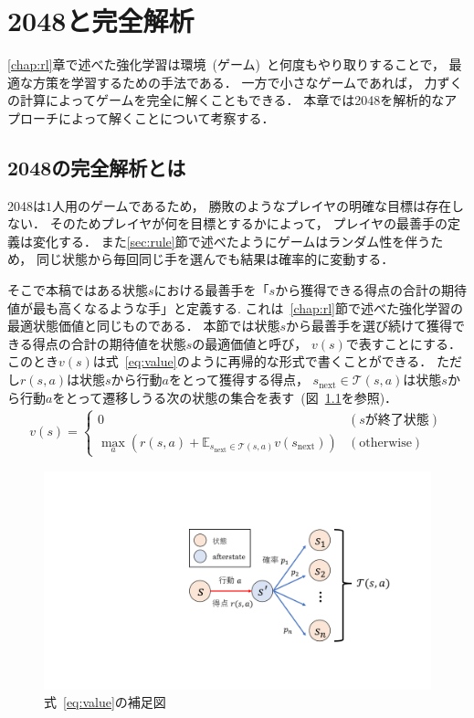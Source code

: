 \chapter{2048と完全解析}
\label{chap:solving}
\ref{chap:rl}章で述べた強化学習は環境~(ゲーム)~と何度もやり取りすることで， 最適な方策を学習するための手法である．
一方で小さなゲームであれば， 力ずくの計算によってゲームを完全に解くこともできる．
本章では2048を解析的なアプローチによって解くことについて考察する．

\section{2048の完全解析とは}
\label{sec:solving}
2048は$1$人用のゲームであるため， 勝敗のようなプレイヤの明確な目標は存在しない．
そのためプレイヤが何を目標とするかによって， プレイヤの最善手の定義は変化する．
また\ref{sec:rule}節で述べたようにゲームはランダム性を伴うため， 同じ状態から毎回同じ手を選んでも結果は確率的に変動する．

そこで本稿ではある状態$s$における最善手を「$s$から獲得できる得点の合計の期待値が最も高くなるような手」と定義する.
これは~\ref{chap:rl}節で述べた強化学習の最適状態価値と同じものである．
本節では状態$s$から最善手を選び続けて獲得できる得点の合計の期待値を状態$s$の最適価値と呼び， $v(s)$で表すことにする．
このとき$v(s)$は式~\ref{eq:value}のように再帰的な形式で書くことができる．
ただし$r(s,a)$は状態$s$から行動$a$をとって獲得する得点， $s_\text{next} \in \mathcal{T}(s,a)$は状態$s$から行動$a$をとって遷移しうる次の状態の集合を表す~(図~\ref{fig:state_afterstate}を参照)．
\begin{align}
    v(s) =
    \begin{cases}
        0 & (s \text{が終了状態}) \\
        \max_a \left(r(s,a) + \mathbb{E}_{s_\text{next} \in \mathcal{T}(s,a)} v(s_\text{next}) \right) & (\text{otherwise})
    \end{cases}
    \label{eq:value}
\end{align}

\begin{figure}[t]
    \centering
    \includegraphics[width=0.6\linewidth{}]{figures/value_function_.pdf}
    \caption{式~\ref{eq:value}の補足図 \label{fig:state_afterstate}}
\end{figure}

